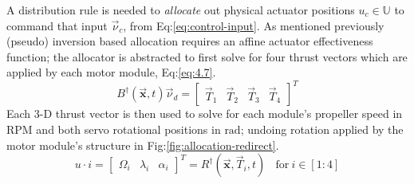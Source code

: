 \par
A distribution rule is needed to \emph{allocate} out physical actuator positions $u_c\in\mathbb{U}$ to command that input $\vec{\nu}_c$, from Eq:\ref{eq:control-input}. As mentioned previously (pseudo) inversion based allocation requires an affine actuator effectiveness function; the allocator is abstracted to first solve for four thrust vectors which are applied by each motor module, Eq:\ref{eq:4.7}.
\begin{equation}\label{eq:5.1}
B^{\dagger}(\vec{\mathbf{x}},t)\vec{\nu}_d=\begin{bmatrix}
\vec{T}_1&\vec{T}_2&\vec{T}_3&\vec{T}_4
\end{bmatrix}^T
\end{equation}
Each 3-D thrust vector is then used to solve for each module's propeller speed in $\text{RPM}$ and both servo rotational positions in $\text{rad}$; undoing rotation applied by the motor module's structure in Fig:\ref{fig:allocation-redirect}.
\begin{equation}
u\cdot i = \begin{bmatrix}\Omega_i&\lambda_i&\alpha_i\end{bmatrix}^T=R^\dagger(\vec{\mathbf{x}},\vec{T}_i,t)~~~~\text{for}~i\in[1:4]
\end{equation}
